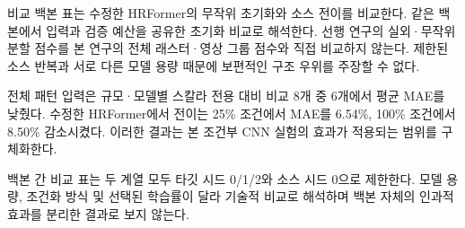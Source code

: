 \documentclass[10pt,a4paper]{article}
\begin{document}
비교 백본 표는 수정한 HRFormer의 무작위 초기화와 소스 전이를 비교한다. 같은 백본에서 입력과 검증 예산을 공유한 초기화 비교로 해석한다. 선행 연구의 실외·무작위 분할 점수를 본 연구의 전체 래스터·영상 그룹 점수와 직접 비교하지 않는다. 제한된 소스 반복과 서로 다른 모델 용량 때문에 보편적인 구조 우위를 주장할 수 없다.

전체 패턴 입력은 규모·모델별 스칼라 전용 대비 비교 8개 중 6개에서 평균 MAE를 낮췄다. 수정한 HRFormer에서 전이는 25\% 조건에서 MAE를 6.54\%, 100\% 조건에서 8.50\% 감소시켰다. 이러한 결과는 본 조건부 CNN 실험의 효과가 적용되는 범위를 구체화한다.

백본 간 비교 표는 두 계열 모두 타깃 시드 0/1/2와 소스 시드 0으로 제한한다. 모델 용량, 조건화 방식 및 선택된 학습률이 달라 기술적 비교로 해석하며 백본 자체의 인과적 효과를 분리한 결과로 보지 않는다.
\end{document}
